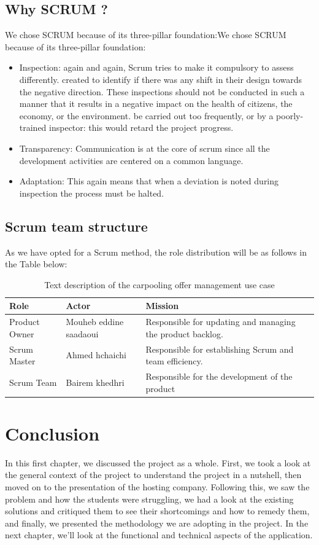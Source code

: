 \subsection{Why SCRUM ?}
We chose SCRUM because of its three-pillar foundation:We chose SCRUM because of its three-pillar foundation:
\begin{itemize}
    \item Inspection: again and again, Scrum tries to make it compulsory to assess differently. created to identify if there was any shift in their design towards the negative direction. These inspections should not be conducted in such a manner that it results in a negative impact on the health of citizens, the economy, or the environment.
    be carried out too frequently, or by a poorly-trained inspector: this would retard the project progress.
    \item Transparency: Communication is at the core of scrum since all the development activities are centered on a common language.
    \item Adaptation: This again means that when a deviation is noted during inspection the process must be halted.
\end{itemize}
\subsection{Scrum team structure}
As we have opted for a Scrum method, the role distribution will be as 
follows in the Table below:
\begin{table}[h]
    \centering
    \begin{tabular}{|p{3cm}|p{4cm}|p{8cm}|}
        \hline
        Role & Actor & Mission\\
        \hline
        Product Owner & Mouheb eddine saadaoui & Responsible for updating and managing the product backlog. \\
        \hline
        Scrum Master & Ahmed hchaichi & Responsible for establishing Scrum and team efficiency. \\
        \hline
        Scrum Team & Bairem khedhri & Responsible for the development of the product \\
        \hline
    \end{tabular}
    \caption{Text description of the carpooling offer management use case}
    \label{Tab: Text description of the carpooling offer management use case}
\end{table}


\section*{Conclusion}
In this first chapter, we discussed the project as a whole. First, we took a look at the general context of the project to understand the project in a nutshell, then moved on to the presentation of the hosting company. Following this, we saw the problem and how the students were struggling, we had a look at the existing solutions and critiqued them to see their shortcomings and how to remedy them, and finally, we presented the methodology we are adopting in the project. In the next chapter, we'll look at the functional and technical aspects of the application.

 
  
